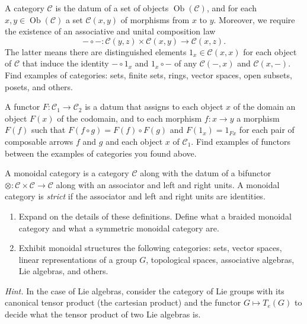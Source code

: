 \begin{question} A category $\mathcal C$ is the datum of
a set of objects $\operatorname{Ob}(\mathcal{C})$, and
for each $x,y\in \operatorname{Ob}(\mathcal{C})$ a
set $\mathcal C(x,y)$ of morphisms from $x$ to $y$.
Moreover, we require the existence of an associative
and unital composition law
\[-\circ -: \mathcal C(y,z) \times  \mathcal C(x,y) 
	\longrightarrow \mathcal C(x,z). \] 
	The latter means there are distinguished elements
	$1_x\in \mathcal{C}(x,x)$ for each object of $\mathcal{C}$
	that induce the identity $-\circ 1_x$ and $1_x\circ -$
	of any $\mathcal{C}(-,x)$ and $\mathcal{C}(x,-)$.
	Find examples of categories: sets, finite sets,
	rings, vector spaces, open subsets, posets, and 
	others.
\end{question}

\begin{question} A functor $F: \mathcal{C}_1\longrightarrow 
\mathcal{C}_2$ is a datum that assigns to each object
$x$ of the domain an object $F(x)$ of the codomain,
and to each morphism $f:x\to y$ a morphism $F(f)$ such
that $F(f\circ g) = F(f) \circ F(g)$ and $F(1_x) = 1_{Fx}$
for each pair of composable arrows $f$ and $g$ and each
object $x$ of $\mathcal C_1$. Find examples of functors
between the examples of categories you found above.

\end{question}
\begin{question} A monoidal category is a category $\mathcal C$ 
along with the datum of a bifunctor $\otimes :
\mathcal{C}\times \mathcal{C}\longrightarrow \mathcal{C}$
along with an associator and left and right units. 
A monoidal category is \emph{strict} if the associator and left
and right units are identities.
\begin{enumerate}
\item Expand on the details of these definitions. Define what
a braided monoidal category and what a symmetric monoidal category are.
\item Exhibit monoidal
structures the following categories: sets, vector spaces,
linear representations of a group $G$, topological spaces,
associative algebras, Lie algebras, and others.
\end{enumerate}
 \emph{Hint.} In the case of Lie algebras,
 consider the category of Lie groups with its
 canonical tensor product (the cartesian product) 
 and the functor $G\longmapsto T_e(G)$ to decide
 what the tensor product of two Lie algebras is.
\end{question}


